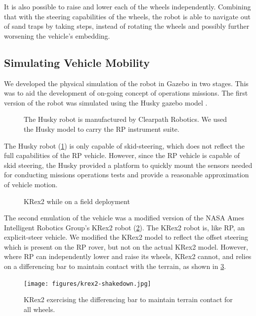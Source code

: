\documentclass[twocolumn,letterpaper]{IEEEAerospaceCLS}  %
\begin{document}
It is also possible to raise and lower each of the wheels independently. 
Combining that with the steering capabilities of the wheels, the robot is able to navigate out of sand traps by taking steps, instead of rotating the wheels and possibly further worsening the vehicle's embedding.

\subsection{Simulating Vehicle Mobility}
\label{sec:simulated-rover}

We developed the physical simulation of the robot in Gazebo in two stages. 
This was to aid the development of on-going concept of operations missions.  
The first version of the robot was simulated using the Husky gazebo model \cite{gariepy2015husky}.  

\begin{figure}[htp]
\caption{The Husky robot is manufactured by Clearpath Robotics.  
We used the Husky model to carry the RP instrument suite. \label{fig:husky}}
\end{figure}

The Husky robot (\cref{fig:husky}) is only capable of skid-steering, which does not reflect the full capabilities of the RP vehicle.  
However, since the RP vehicle is capable of skid steering, the Husky provided a platform to quickly mount the sensors needed for conducting missions operations tests and provide a reasonable approximation of vehicle motion.  

\begin{figure}[htp]
\caption{KRex2 while on a field deployment \label{fig:krex2}}
\end{figure}

The second emulation of the vehicle was a modified version of the NASA Ames Intelligent Robotics Group's KRex2 robot (\cref{fig:krex2}).  
The KRex2 robot is, like RP, an explicit-steer vehicle.  
We modified the KRex2 model to reflect the offset steering which is present on the RP rover, but not on the actual KRex2 model.  
However, where RP can independently lower and raise its wheels, KRex2 cannot, and relies on a differencing bar to maintain contact with the terrain, as shown in \cref{fig:krex2-differencing}.    

\begin{figure}[htp]
\texttt{[image: figures/krex2-shakedown.jpg]}
\caption{KRex2 exercising the differencing bar to maintain terrain contact for all wheels. \label{fig:krex2-differencing}}
\end{figure}
\end{document}
